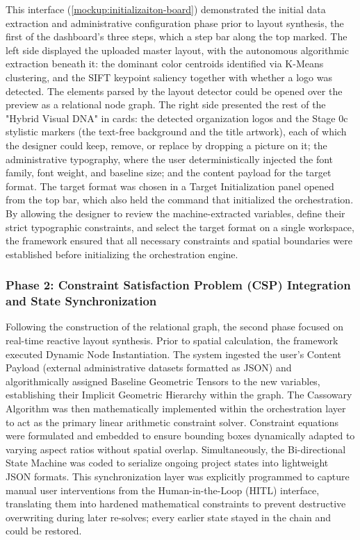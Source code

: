 \begin{refsection}
This interface (\ref{mockup:initializaiton-board}) demonstrated the initial data extraction and administrative configuration phase prior to layout synthesis, the first of the dashboard's three steps, which a step bar along the top marked. The left side displayed the uploaded master layout, with the autonomous algorithmic extraction beneath it: the dominant color centroids identified via K-Means clustering, and the SIFT keypoint saliency together with whether a logo was detected. The elements parsed by the layout detector could be opened over the preview as a relational node graph. The right side presented the rest of the "Hybrid Visual DNA" in cards: the detected organization logos and the Stage 0c stylistic markers (the text-free background and the title artwork), each of which the designer could keep, remove, or replace by dropping a picture on it; the administrative typography, where the user deterministically injected the font family, font weight, and baseline size; and the content payload for the target format. The target format was chosen in a Target Initialization panel opened from the top bar, which also held the command that initialized the orchestration. By allowing the designer to review the machine-extracted variables, define their strict typographic constraints, and select the target format on a single workspace, the framework ensured that all necessary constraints and spatial boundaries were established before initializing the orchestration engine.

\subsubsection{Phase 2: Constraint Satisfaction Problem (CSP) Integration and State Synchronization}
Following the construction of the relational graph, the second phase focused on real-time reactive layout synthesis. Prior to spatial calculation, the framework executed Dynamic Node Instantiation. The system ingested the user's Content Payload (external administrative datasets formatted as JSON) and algorithmically assigned Baseline Geometric Tensors to the new variables, establishing their Implicit Geometric Hierarchy within the graph. The Cassowary Algorithm was then mathematically implemented within the orchestration layer to act as the primary linear arithmetic constraint solver. Constraint equations were formulated and embedded to ensure bounding boxes dynamically adapted to varying aspect ratios without spatial overlap. Simultaneously, the Bi-directional State Machine was coded to serialize ongoing project states into lightweight JSON formats. This synchronization layer was explicitly programmed to capture manual user interventions from the Human-in-the-Loop (HITL) interface, translating them into hardened mathematical constraints to prevent destructive overwriting during later re-solves; every earlier state stayed in the chain and could be restored.


\end{refsection}
